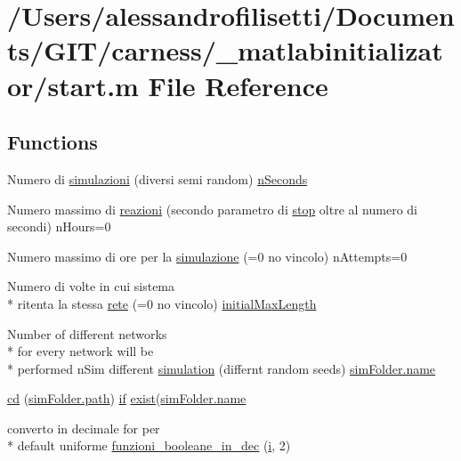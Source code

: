 \hypertarget{a00113}{\section{/\+Users/alessandrofilisetti/\+Documents/\+G\+I\+T/carness/\+\_\+matlabinitializator/start.m File Reference}
\label{a00113}
}
\subsection*{Functions}
\begin{DoxyCompactItemize}
\item 
Numero di \hyperlink{a00113_a1b273eb41d82b5ca6c9f74a3c0aa2855}{simulazioni} (diversi semi random) \hyperlink{a00112_aaded2f2d61413dc4bddf805e9be03ded}{n\+Seconds}
\item 
Numero massimo di \hyperlink{a00113_a69962f56e60d0c88abc5d4b6839c2886}{reazioni} (secondo parametro di \hyperlink{a00030_a6bd08e37edf4151f5f6d1fc27a6f227a}{stop} oltre al numero di secondi) n\+Hours=0
\item 
Numero massimo di ore per la \hyperlink{a00113_ad4ff287bf077be8ffb479fcc197bc548}{simulazione} (=0 no vincolo) n\+Attempts=0
\item 
Numero di volte in cui sistema \\*
ritenta la stessa \hyperlink{a00113_a40d2922f55b48d94c99038a8c2bef2ff}{rete} (=0 no vincolo) \hyperlink{a00112_a4c7433c24b6426a15069cc5a93a5cbec}{initial\+Max\+Length}
\item 
Number of different networks \\*
for every network will be \\*
performed n\+Sim different \hyperlink{a00113_a096e1441156fd2c744baece86d6b295c}{simulation} (differnt random seeds) \hyperlink{a00027_abbf559a76fab59203496b0847ab9502a}{sim\+Folder.\+name}
\item 
\hyperlink{a00113_abe327856a9ee2f30f3ccafe4dc9edf5e}{cd} (\hyperlink{a00113_af28466084b87af2cdc5c7b48f4661f2d}{sim\+Folder.\+path}) \hyperlink{a00030_a01d55766b8058903dd360b4bda71f9f5}{if} \hyperlink{a00032_ab41b8dc78dee42a1a5e5a33d8bf6eeb3}{exist}(\hyperlink{a00027_abbf559a76fab59203496b0847ab9502a}{sim\+Folder.\+name}
\item 
converto in decimale for per \\*
default uniforme \hyperlink{a00113_aca80ac3e93dabd95e623a51f90fb37b6}{funzioni\+\_\+booleane\+\_\+in\+\_\+dec} (\hyperlink{a00113_ad3efca1ea6e3333daf30719ee0501862}{i}, 2)
\end{DoxyCompactItemize}
